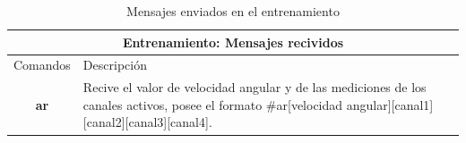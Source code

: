 \vspace{80pt}
\begin{table}[h]
    \centering
    \begin{tabular}{ |c|p{14cm}|}
        \hline
        \multicolumn{2}{|c|}{Entrenamiento: Mensajes recividos} \\
        \hline
        Comandos        &   Descripción \\\hline
        \textbf{ar}     &   \begin{minipage}{14cm}
                                \vspace{2pt}    
                                Recive el valor de velocidad angular y de las mediciones de los canales activos, posee el formato 
                                \#ar[velocidad angular][canal1][canal2][canal3][canal4]. 
                                \vspace{2pt}    
                            \end{minipage}\\\hline 
    \end{tabular}
    \caption{Mensajes enviados en el entrenamiento}
    \label{table:recived-msg-in-game}
\end{table}

